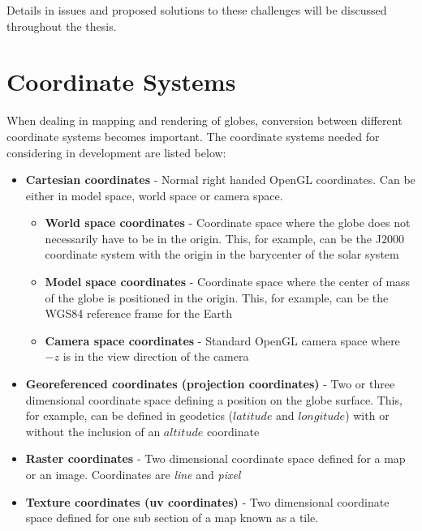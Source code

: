 Details in issues and proposed solutions to these challenges will be discussed throughout the thesis.

\section{Coordinate Systems}

When dealing in mapping and rendering of globes, conversion between different coordinate systems becomes important. The coordinate systems needed for considering in development are listed below:

\begin{itemize}
\item \textbf{Cartesian coordinates} - Normal right handed OpenGL coordinates. Can be either in model space, world space or camera space.

\begin{itemize}
\item \textbf{World space coordinates} - Coordinate space where the globe does not necessarily have to be in the origin. This, for example, can be the J2000 coordinate system with the origin in the barycenter of the solar system
\item \textbf{Model space coordinates} - Coordinate space where the center of mass of the globe is positioned in the origin. This, for example, can be the WGS84 reference frame for the Earth
\item \textbf{Camera space coordinates} - Standard OpenGL camera space where $-z$ is in the view direction of the camera
\end{itemize}

\item \textbf{Georeferenced coordinates (projection coordinates)} - Two or three dimensional coordinate space defining a position on the globe surface. This, for example, can be defined in geodetics ($latitude$ and $longitude$) with or without the inclusion of an $altitude$ coordinate

\item \textbf{Raster coordinates} - Two dimensional coordinate space defined for a map or an image. Coordinates are \emph{line} and \emph{pixel}

\item \textbf{Texture coordinates (uv coordinates)} - Two dimensional coordinate space defined for one sub section of a map known as a tile.

\end{itemize}
